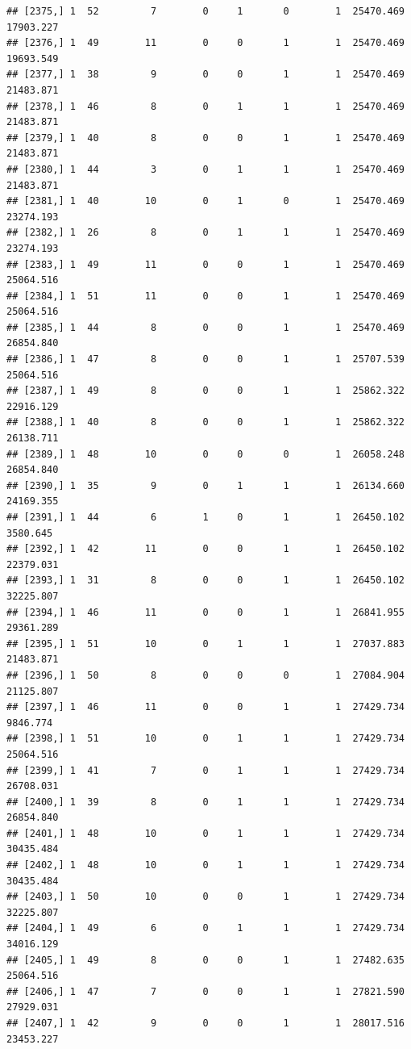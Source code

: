 \documentclass[
]{article}
\begin{document}
\begin{verbatim}
## [2375,] 1  52         7        0     1       0        1  25470.469  17903.227
## [2376,] 1  49        11        0     0       1        1  25470.469  19693.549
## [2377,] 1  38         9        0     0       1        1  25470.469  21483.871
## [2378,] 1  46         8        0     1       1        1  25470.469  21483.871
## [2379,] 1  40         8        0     0       1        1  25470.469  21483.871
## [2380,] 1  44         3        0     1       1        1  25470.469  21483.871
## [2381,] 1  40        10        0     1       0        1  25470.469  23274.193
## [2382,] 1  26         8        0     1       1        1  25470.469  23274.193
## [2383,] 1  49        11        0     0       1        1  25470.469  25064.516
## [2384,] 1  51        11        0     0       1        1  25470.469  25064.516
## [2385,] 1  44         8        0     0       1        1  25470.469  26854.840
## [2386,] 1  47         8        0     0       1        1  25707.539  25064.516
## [2387,] 1  49         8        0     0       1        1  25862.322  22916.129
## [2388,] 1  40         8        0     0       1        1  25862.322  26138.711
## [2389,] 1  48        10        0     0       0        1  26058.248  26854.840
## [2390,] 1  35         9        0     1       1        1  26134.660  24169.355
## [2391,] 1  44         6        1     0       1        1  26450.102   3580.645
## [2392,] 1  42        11        0     0       1        1  26450.102  22379.031
## [2393,] 1  31         8        0     0       1        1  26450.102  32225.807
## [2394,] 1  46        11        0     0       1        1  26841.955  29361.289
## [2395,] 1  51        10        0     1       1        1  27037.883  21483.871
## [2396,] 1  50         8        0     0       0        1  27084.904  21125.807
## [2397,] 1  46        11        0     0       1        1  27429.734   9846.774
## [2398,] 1  51        10        0     1       1        1  27429.734  25064.516
## [2399,] 1  41         7        0     1       1        1  27429.734  26708.031
## [2400,] 1  39         8        0     1       1        1  27429.734  26854.840
## [2401,] 1  48        10        0     1       1        1  27429.734  30435.484
## [2402,] 1  48        10        0     1       1        1  27429.734  30435.484
## [2403,] 1  50        10        0     0       1        1  27429.734  32225.807
## [2404,] 1  49         6        0     1       1        1  27429.734  34016.129
## [2405,] 1  49         8        0     0       1        1  27482.635  25064.516
## [2406,] 1  47         7        0     0       1        1  27821.590  27929.031
## [2407,] 1  42         9        0     0       1        1  28017.516  23453.227

\end{verbatim}
\end{document}
